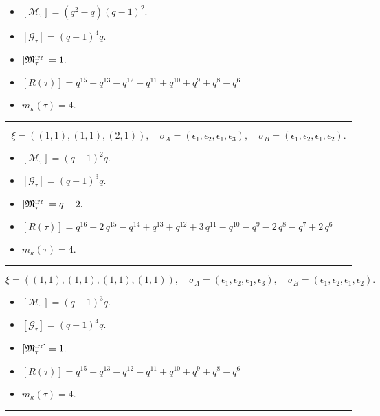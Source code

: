 \documentclass[10pt,a4paper]{amsart}
\begin{document}
\begin{itemize}
 \item $[\mathcal{M}_{\tau}] = {\left(q^{2} - q\right)} {\left(q - 1\right)}^{2} .$

 \item $[\mathcal{G}_{\tau}] = {\left(q - 1\right)}^{4} q .$

 \item $[{\frak M}_{\tau}^{\textrm{irr}}] = 1 .$

 \item $[R(\tau)] = q^{15} - q^{13} - q^{12} - q^{11} + q^{10} + q^{9} + q^{8} - q^{6} $

 \item $m_{\kappa}(\tau) = 4 .$

 \end{itemize}
\noindent\rule{8cm}{0.4pt}

$$\xi = ({(1, 1)}, {(1, 1)}, {(2, 1)}),\quad \sigma_A = ({{\epsilon_1}}, {{\epsilon_2}}, {{\epsilon_1, \epsilon_3}}),\quad \sigma_B = ({{\epsilon_1}}, {{\epsilon_2}}, {{\epsilon_1, \epsilon_2}}).$$

\begin{itemize}
 \item $[\mathcal{M}_{\tau}] = {\left(q - 1\right)}^{2} q .$

 \item $[\mathcal{G}_{\tau}] = {\left(q - 1\right)}^{3} q .$

 \item $[{\frak M}_{\tau}^{\textrm{irr}}] = q - 2 .$

 \item $[R(\tau)] = q^{16} - 2 \, q^{15} - q^{14} + q^{13} + q^{12} + 3 \, q^{11} - q^{10} - q^{9} - 2 \, q^{8} - q^{7} + 2 \, q^{6} $

 \item $m_{\kappa}(\tau) = 4 .$

 \end{itemize}
\noindent\rule{8cm}{0.4pt}

$$\xi = ({(1, 1)}, {(1, 1)}, {(1, 1)}, {(1, 1)}),\quad \sigma_A = ({{\epsilon_1}}, {{\epsilon_2}}, {{\epsilon_1}}, {{\epsilon_3}}),\quad \sigma_B = ({{\epsilon_1}}, {{\epsilon_2}}, {{\epsilon_1}}, {{\epsilon_2}}).$$

\begin{itemize}
 \item $[\mathcal{M}_{\tau}] = {\left(q - 1\right)}^{3} q .$

 \item $[\mathcal{G}_{\tau}] = {\left(q - 1\right)}^{4} q .$

 \item $[{\frak M}_{\tau}^{\textrm{irr}}] = 1 .$

 \item $[R(\tau)] = q^{15} - q^{13} - q^{12} - q^{11} + q^{10} + q^{9} + q^{8} - q^{6} $

 \item $m_{\kappa}(\tau) = 4 .$

 \end{itemize}
\noindent\rule{8cm}{0.4pt}
\end{document}
